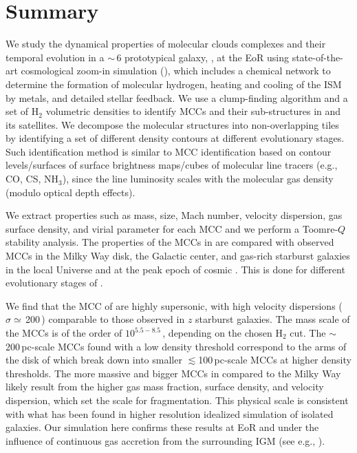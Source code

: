 \IfFileExists{emulateapjlegacy.cls}{\documentclass[iop]{emulateapjlegacy}}{\documentclass[iop]{emulateapj}}
\begin{document}
\section{Summary}      \label{sec:conclusion}

We study the dynamical properties of molecular clouds complexes and their temporal evolution in a \z$\sim$\,6 prototypical galaxy, \flower,
at the EoR using state-of-the-art cosmological zoom-in simulation (),
which includes a chemical network to determine the formation of molecular
hydrogen, heating and cooling of the ISM by metals, and detailed stellar feedback.
We use a clump-finding algorithm and a set of H$_2$ volumetric densities
to identify MCCs and their sub-structures in \flower and its satellites.
We decompose the molecular structures into non-overlapping tiles
by identifying a set of different density contours at different evolutionary stages.
Such identification method is similar to MCC identification based on 
contour levels/surfaces of surface brightness maps/cubes of molecular line tracers (e.g., CO, CS, NH$_3$),
since the line luminosity scales with the molecular gas density (modulo optical depth effects).

We extract properties such as mass, size, Mach number, velocity dispersion, gas surface density, and virial parameter for each MCC and we perform a Toomre-$Q$ stability analysis. The properties of the MCCs in \flower are compared with observed MCCs in the Milky Way disk, the Galactic center, and gas-rich starburst galaxies in the local Universe and at the peak epoch of cosmic \SF. This is done for different evolutionary stages of \flower.

We find that the MCC of \flower are highly supersonic, with high velocity dispersions ($\sigma\simeq$\,200\,\kms) comparable to
those observed in $z$ starburst galaxies.
The mass scale of the MCCs is of the order of $10^{5.5-8.5}$\,\Msun, depending on the chosen H$_{2}$ cut. 
The $\sim$200\,pc-scale MCCs found with a low density threshold
correspond to the arms of the disk of \flower which break down into smaller $\lesssim$100\,pc-scale MCCs at higher density thresholds.
The more massive and bigger MCCs in \flower compared to the Milky Way
likely result from the higher gas mass fraction, surface density, and velocity dispersion,
which set the scale for fragmentation.
This physical scale is
consistent with what has been found in higher resolution idealized simulation of isolated galaxies.
Our simulation here confirms these results at EoR and under
the influence of continuous gas accretion from the surrounding IGM (see e.g., \citealt{Klessen10a, Goldbaum11a}).
\end{document}
